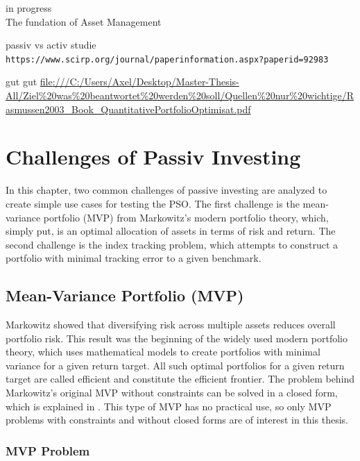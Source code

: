 \documentclass[
  oneside]{book}
\begin{document}
\textbar\textbar\textbar in progress\textbar\textbar\textbar{}\\
The fundation of Asset Management

passiv vs activ studie
\texttt{https://www.scirp.org/journal/paperinformation.aspx?paperid=92983}

gut gut
\url{file:///C:/Users/Axel/Desktop/Master-Thesis-All/Ziel\%20was\%20beantwortet\%20werden\%20soll/Quellen\%20nur\%20wichtige/Rasmussen2003_Book_QuantitativePortfolioOptimisat.pdf}

\hypertarget{challenges}{%
\chapter{Challenges of Passiv Investing}\label{challenges}}

In this chapter, two common challenges of passive investing are analyzed to create simple use cases for testing the PSO. The first challenge is the mean-variance portfolio (MVP) from Markowitz's modern portfolio theory, which, simply put, is an optimal allocation of assets in terms of risk and return. The second challenge is the index tracking problem, which attempts to construct a portfolio with minimal tracking error to a given benchmark.

\hypertarget{mean-variance-portfolio-mvp}{%
\section{Mean-Variance Portfolio (MVP)}\label{mean-variance-portfolio-mvp}}

Markowitz showed that diversifying risk across multiple assets reduces overall portfolio risk. This result was the beginning of the widely used modern portfolio theory, which uses mathematical models to create portfolios with minimal variance for a given return target. All such optimal portfolios for a given return target are called efficient and constitute the efficient frontier. The problem behind Markowitz's original MVP without constraints can be solved in a closed form, which is explained in \citep{Eric2021}. This type of MVP has no practical use, so only MVP problems with constraints and without closed forms are of interest in this thesis.

\hypertarget{mvp-problem}{%
\subsection{MVP Problem}\label{mvp-problem}}
\end{document}
